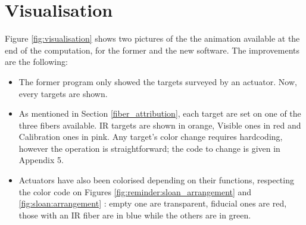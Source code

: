 \section{Visualisation} \label{visualisation}

Figure \ref{fig:visualisation} shows two pictures of the the animation available at the end of the computation, for the former and the new software. The improvements are the following: 
\begin{itemize}
	\item The former program only showed the targets surveyed by an actuator. Now, every targets are shown.
	\item As mentioned in Section \ref{fiber_attribution}, each target are set on one of the three fibers available. IR targets are shown in orange, Visible ones in red and Calibration ones in pink. Any target's color change requires hardcoding, however the operation is straightforward; the code to change is given in Appendix 5.
	\item Actuators have also been colorised depending on their functions, respecting the color code on Figures \ref{fig:reminder:sloan_arrangement} and \ref{fig:sloan:arrangement} : empty one are transparent, fiducial ones are red, those with an IR fiber are in blue while the others are in green.
\end{itemize}


